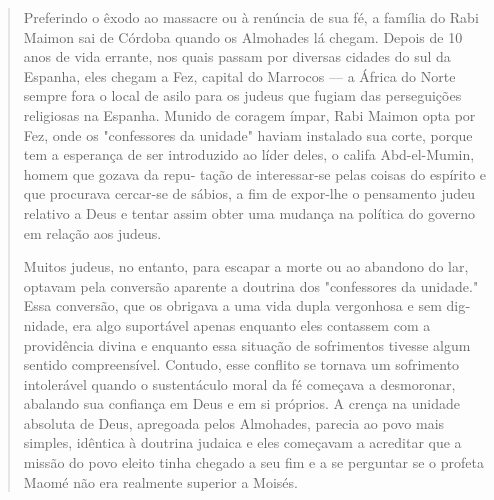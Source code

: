 \begin{quote}
Preferindo o êxodo ao massacre ou à renúncia de sua fé, a família do
Rabi Maimon sai de Córdoba quando os Almohades lá chegam. Depois de 10
anos de vida errante, nos quais passam por diversas cidades do sul da
Espa­nha, eles chegam a Fez, capital do Marrocos --- a África do Norte
sempre fora o local de asilo para os judeus que fugiam das perseguições
religiosas na Espa­nha. Munido de coragem ímpar, Rabi Maimon opta por
Fez, onde os "confes­sores da unidade" haviam instalado sua corte,
porque tem a esperança de ser introduzido ao líder deles, o califa
Abd-el-Mumin, homem que gozava da repu-
tação de interessar-se pelas coisas do espírito e que procurava
cercar-se de sá­bios, a fim de expor-lhe o pensamento judeu relativo a
Deus e tentar assim ob­ter uma mudança na política do governo em relação
aos judeus.

Muitos judeus, no entanto, para escapar a morte ou ao abandono do lar,
optavam pela conversão aparente a doutrina dos "confessores da
unida­de." Essa conversão, que os obrigava a uma vida dupla vergonhosa e
sem dig­nidade, era algo suportável apenas enquanto eles contassem com a
providência divina e enquanto essa situação de sofrimentos tivesse algum
sentido compreen­sível. Contudo, esse conflito se tornava um sofrimento
intolerável quando o sustentáculo moral da fé começava a desmoronar,
abalando sua confiança em Deus e em si próprios. A crença na unidade
absoluta de Deus, apregoada pelos Almohades, parecia ao povo mais
simples, idêntica à doutrina judaica e eles co­meçavam a acreditar que a
missão do povo eleito tinha chegado a seu fim e a se perguntar se o
profeta Maomé não era realmente superior a Moisés.


\end{quote}

